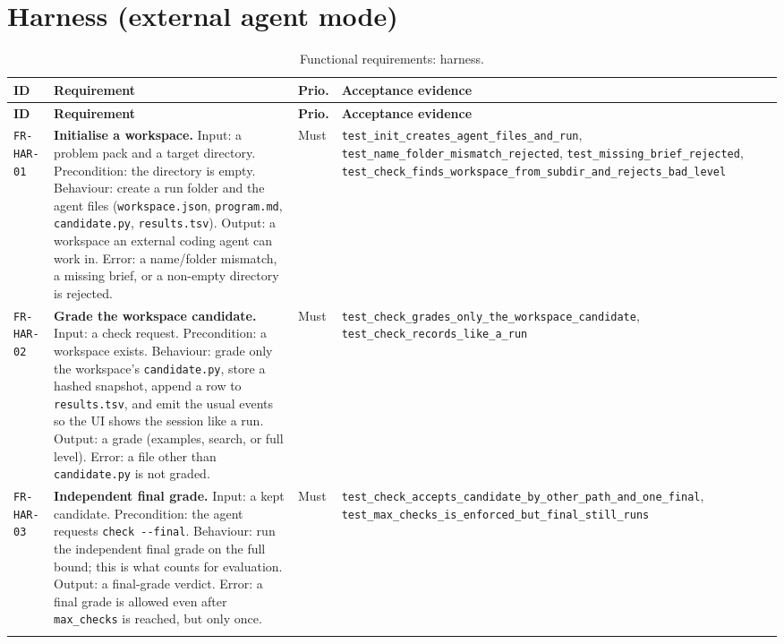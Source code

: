 \section{Harness (external agent mode)}
\label{sec:fr-har}

\begin{longtable}{@{}>{\raggedright\arraybackslash}p{}>{\raggedright\arraybackslash}p{}p{}>{\raggedright\arraybackslash}p{}@{}}
\caption{Functional requirements: harness.}\label{tab:fr-har}\\
\toprule
\textbf{ID} & \textbf{Requirement} & \textbf{Prio.} & \textbf{Acceptance evidence} \\
\midrule
\endfirsthead
\toprule
\textbf{ID} & \textbf{Requirement} & \textbf{Prio.} & \textbf{Acceptance evidence} \\
\midrule
\endhead
\bottomrule
\endfoot

\texttt{FR-HAR-01} & \textbf{Initialise a workspace.} Input: a problem pack and a
target directory. Precondition: the directory is empty. Behaviour: create a run
folder and the agent files (\texttt{workspace.json}, \texttt{program.md},
\texttt{candidate.py}, \texttt{results.tsv}). Output: a workspace an external
coding agent can work in. Error: a name/folder mismatch, a missing brief, or a
non-empty directory is rejected. & Must & \texttt{test\_init\_creates\_agent\_files\_and\_run},
\texttt{test\_name\_folder\_mismatch\_rejected}, \texttt{test\_missing\_brief\_rejected},
\texttt{test\_check\_finds\_workspace\_from\_subdir\_and\_rejects\_bad\_level} \\
\addlinespace[2pt]

\texttt{FR-HAR-02} & \textbf{Grade the workspace candidate.} Input: a check
request. Precondition: a workspace exists. Behaviour: grade only the workspace's
\texttt{candidate.py}, store a hashed snapshot, append a row to
\texttt{results.tsv}, and emit the usual events so the UI shows the session like a
run. Output: a grade (examples, search, or full level). Error: a file other than
\texttt{candidate.py} is not graded. & Must & \texttt{test\_check\_grades\_only\_the\_workspace\_candidate},
\texttt{test\_check\_records\_like\_a\_run} \\
\addlinespace[2pt]

\texttt{FR-HAR-03} & \textbf{Independent final grade.} Input: a kept candidate.
Precondition: the agent requests \texttt{check -{}-final}. Behaviour: run the
independent final grade on the full bound; this is what counts for evaluation.
Output: a final-grade verdict. Error: a final grade is allowed even after
\texttt{max\_checks} is reached, but only once. & Must &
\texttt{test\_check\_accepts\_candidate\_by\_other\_path\_and\_one\_final},
\texttt{test\_max\_checks\_is\_enforced\_but\_final\_still\_runs} \\
\addlinespace[2pt]


\end{longtable}

